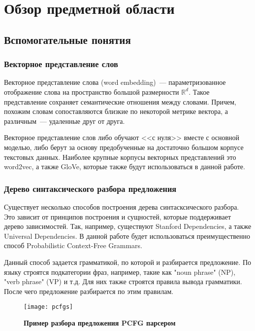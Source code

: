 
\chapter{Обзор предметной области}

\section{Вспомогательные понятия}

\subsection{Векторное представление слов}
Векторное представление слова (word embedding)\cite{Bengio03aneural}~--- параметризованное отображение слова на пространство большой размерности $\mathbb{R}^d$. 
Такое представление сохраняет семантические отношения между словами. 
Причем, похожим словам сопоставляются близкие по некоторой метрике вектора, 
а различным~--- удаленные друг от друга.

Векторное представление слов либо обучают <<с нуля>> вместе с основной моделью, либо берут за основу предобученные на достаточно большом корпусе текстовых данных. Наиболее крупные корпусы векторных представлений это word2vec\cite{DBLP:journals/corr/MikolovLS13, wor2vec}, а также GloVe\cite{pennington2014glove, glove}, которые также будут использоваться в данной работе.

\subsection{Дерево синтаксического разбора предложения}
Существует несколько способов построения дерева синтасксического разбора.
Это зависит от принципов построения и сущностей, которые поддерживает дерево зависимостей.
Так, например, существуют Stanford Dependencies\cite{standeps}, а также Universal Dependencies\cite{unideps}.
В данной работе будет использоваться преимущественно способ Probabilistic Context-Free Grammars\cite{pcfg}.

Данный способ задается грамматикой, по которой и разбирается предложение\cite{Klein03accurateunlexicalized}.
По языку строятся подкатегории фраз, например, такие как "noun phrase" (NP), "verb phrase" (VP) и т.д. 
Для них также строятся правила вывода грамматики. После чего предложение разбирается по этим правилам. 

\begin{figure}[h]
\texttt{[image: pcfgs]}
\caption{\textbf{Пример разбора предложения PCFG парсером}}
\label{fig:pcfgs}
\end{figure}

